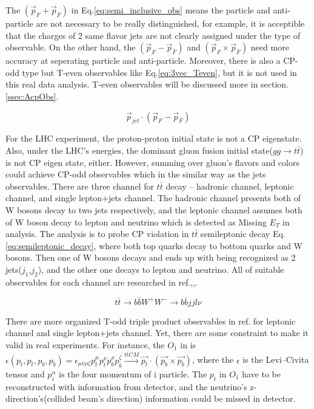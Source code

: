 		The $(\vec{p}_F + \vec{p}_{\bar{F}})$ in Eq.\ref{eq:semi_inclusive_obs} means the particle and anti-particle are not necessary to be really distinguished, for example, it is acceptible that the charges of 2 same flavor jets are not clearly assigned under the type of observable. On the other hand, the $(\vec{p}_F - \vec{p}_{\bar{F}})$ and $(\vec{p}_F \times \vec{p}_{\bar{F}})$ need more accuracy at seperating particle and anti-particle. Moreover, there is also a CP-odd type but T-even observables like Eq.\ref{eq:3vec_Teven}, but it is not used in this real data analysis. T-even observables will be discussed more in section.\ref{ssec:AcpObs}.

		\begin{equation}
		\vec{p}_{jet} \cdot ( \vec{p}_F - \vec{p}_{\bar{F}} )
		\label{eq:3vec_Teven}
		\end{equation}
		\FloatBarrier


		For the LHC experiment, the proton-proton initial state is not a CP eigenstate. Also, under the LHC's energies, the dominant gluon fusion initial state($gg \rightarrow t\bar{t}$) is not CP eigen state, either. However, summing over gluon's flavors and colors could achieve CP-odd observables which in the similar way as the jets observables. There are three channel for $t\bar{t}$ decay -- hadronic channel, leptonic channel, and single lepton+jets channel. The hadronic channel presents both of W bosons decay to two jets respectively, and the leptonic channel assumes both of W boson decay to lepton and neutrino which is detected as Missing $E_T$ in analysis. The analysis is to probe CP violation in $t\bar{t}$ semileptonic decay Eq.\ref{eq:semileptonic_decay}, where both top quarks decay to bottom quarks and W bosons. Then one of W bosons decays and ends up with being recognized as 2 jets($j_1$,$j_2$), and the other one decays to lepton and neutrino. All of suitable observables for each channel are researched in ref.\cite{PhysRevD.80.034013},\cite{PhysRevD.81.034013},\cite{Hayreter:2015ryk}.

		\begin{equation}
		t\bar{t} \rightarrow b\bar{b} W^+W^- \rightarrow b\bar{b} jj l \nu
		\label{eq:semileptonic_decay}
		\end{equation}
		\FloatBarrier

		There are more organized T-odd triple product observables in ref.\cite{Hayreter:2015ryk} for leptonic channel and single lepton+jets channel. Yet, there are some constraint to make it valid in real experiments. For instance, the $O_1$ in\cite{Hayreter:2015ryk} is $\epsilon(p_t,p_{\bar{t}},p_b,p_{\bar{b}}) = \epsilon_{\mu \nu \rho \zeta}p_t^{\mu}p_{\bar{t}}^{\nu}p_b^{\rho}p_{\bar{b}}^{\zeta} \xrightarrow[]{t\overline{t}CM} \vec{p_t} \cdot ( \vec{p_b} \times \vec{p_{\overline{b}}} )$, where the $\epsilon$ is the Levi–Civita tensor and $p_i^{\alpha}$ is the four momentum of i particle. The $p_t$ in $O_1$ have to be reconstructed with information from detector, and the neutrino's z-direction's(collided beam's direction) information could be missed in detector.

